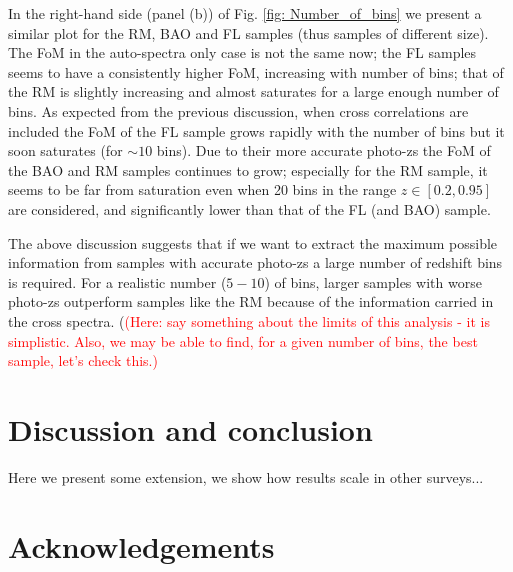 \documentclass[a4paper,fleqn,usenatbib]{mnras}
\begin{document}
In the right-hand side (panel (b)) of Fig. \ref{fig: Number_of_bins} we present a similar plot for the RM, BAO and FL samples (thus samples of different size). The FoM in the auto-spectra only case is not the same now; the FL samples seems to have a consistently higher FoM, increasing with number of bins; that of the RM is slightly increasing and almost saturates for a large enough number of bins.  As expected from the previous discussion, when cross correlations are included the FoM of the FL sample grows rapidly with the number of bins but it soon saturates (for $\sim 10$ bins). Due to their more accurate photo-zs the FoM  of the BAO and RM samples continues to grow; especially for the RM sample, it seems to be far from saturation even when 20 bins in the range $z \in [0.2,0.95]$ are considered, and significantly lower than that of the FL (and BAO) sample.

The above discussion suggests that if we want to extract the maximum possible information from samples with accurate photo-zs a large number of redshift bins is required. For a realistic number ($5-10$) of bins, larger samples with worse photo-zs outperform samples like the RM because of the information carried in the cross spectra. (\textcolor{red}{(Here: say something about the limits of this analysis - it is simplistic. Also, we may be able to find, for a given number of bins, the best sample, let's check this.)}



\section{Discussion and conclusion}


Here we present some extension, we show how results scale in other surveys...




\section*{Acknowledgements}






%
\end{document}
